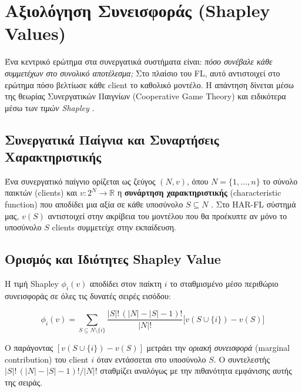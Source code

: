 
\section{Αξιολόγηση Συνεισφοράς (Shapley Values)}
\label{sec:shapley}

Ένα κεντρικό ερώτημα στα συνεργατικά συστήματα είναι: \textit{πόσο
συνέβαλε κάθε συμμετέχων στο συνολικό αποτέλεσμα;} Στο πλαίσιο του
FL, αυτό αντιστοιχεί στο ερώτημα πόσο βελτίωσε κάθε client το
καθολικό μοντέλο. Η απάντηση δίνεται μέσω της θεωρίας Συνεργατικών
Παιγνίων (Cooperative Game Theory) και ειδικότερα μέσω των
\textit{τιμών Shapley} \cite{Shapley1953}.

\subsection{Συνεργατικά Παίγνια και Συναρτήσεις Χαρακτηριστικής}
\label{subsec:cooperative_games}

Ένα συνεργατικό παίγνιο ορίζεται ως ζεύγος $(N, v)$, όπου
$N = \{1, \ldots, n\}$ το σύνολο παικτών (clients) και
$v: 2^N \rightarrow \mathbb{R}$ η \textbf{συνάρτηση χαρακτηριστικής}
(characteristic function) που αποδίδει μια αξία σε κάθε υποσύνολο
$S \subseteq N$ \cite{Wang2019}. Στο HAR-FL σύστημά μας, $v(S)$
αντιστοιχεί στην ακρίβεια του μοντέλου που θα προέκυπτε αν μόνο
το υποσύνολο $S$ clients συμμετείχε στην εκπαίδευση.

\subsection{Ορισμός και Ιδιότητες Shapley Value}
\label{subsec:shapley_def}

Η τιμή Shapley $\phi_i(v)$ αποδίδει στον παίκτη $i$ το σταθμισμένο
μέσο περιθώριο συνεισφοράς σε όλες τις δυνατές σειρές εισόδου:

\begin{equation}
    \label{eq:shapley}
    \phi_i(v) = \sum_{S \subseteq N \setminus \{i\}}
    \frac{|S|!\,(|N|-|S|-1)!}{|N|!}
    \bigl[v(S \cup \{i\}) - v(S)\bigr]
\end{equation}

\noindent Ο παράγοντας $[v(S \cup \{i\}) - v(S)]$ μετράει την
\textit{οριακή συνεισφορά} (marginal contribution) του client $i$
όταν εντάσσεται στο υποσύνολο $S$. Ο συντελεστής
$|S|!\,(|N|-|S|-1)!/|N|!$ σταθμίζει αναλόγως με την πιθανότητα
εμφάνισης αυτής της σειράς.

